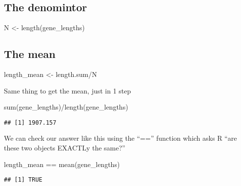 \documentclass[
]{book}
\newenvironment{Shaded}{\begin{snugshade}}{\end{snugshade}}
\newcommand{\FunctionTok}[1]{\textcolor[rgb]{0.00,0.00,0.00}{#1}}
\newcommand{\NormalTok}[1]{#1}
\newcommand{\OtherTok}[1]{\textcolor[rgb]{0.56,0.35,0.01}{#1}}
\newcommand{\SpecialCharTok}[1]{\textcolor[rgb]{0.00,0.00,0.00}{#1}}
\begin{document}
\hypertarget{the-denomintor}{%
\subsection{The denomintor}\label{the-denomintor}}

\begin{Shaded}
\begin{Highlighting}[]
\NormalTok{N }\OtherTok{\textless{}{-}} \FunctionTok{length}\NormalTok{(gene\_lengths)}
\end{Highlighting}
\end{Shaded}

\hypertarget{the-mean}{%
\subsection{The mean}\label{the-mean}}

\begin{Shaded}
\begin{Highlighting}[]
\NormalTok{length\_mean }\OtherTok{\textless{}{-}}\NormalTok{ length.sum}\SpecialCharTok{/}\NormalTok{N}
\end{Highlighting}
\end{Shaded}

Same thing to get the mean, just in 1 step

\begin{Shaded}
\begin{Highlighting}[]
 \FunctionTok{sum}\NormalTok{(gene\_lengths)}\SpecialCharTok{/}\FunctionTok{length}\NormalTok{(gene\_lengths)}
\end{Highlighting}
\end{Shaded}

\begin{verbatim}
## [1] 1907.157
\end{verbatim}

We can check our answer like this using the ``=='' function which asks R ``are these two objects EXACTLy the same?''

\begin{Shaded}
\begin{Highlighting}[]
\NormalTok{length\_mean }\SpecialCharTok{==} \FunctionTok{mean}\NormalTok{(gene\_lengths)}
\end{Highlighting}
\end{Shaded}

\begin{verbatim}
## [1] TRUE
\end{verbatim}
\end{document}
